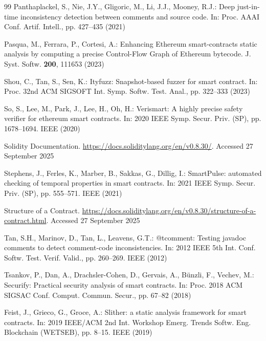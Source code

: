 \documentclass[pdflatex,sn-basic]{sn-jnl}%
\theoremstyle{thmstyleone}%
\theoremstyle{thmstyletwo}%
\theoremstyle{thmstylethree}%
\begin{document}
\begin{thebibliography}{99}
 Panthaplackel, S., Nie, J.Y., Gligoric, M., Li, J.J., Mooney, R.J.: Deep just-in-time inconsistency detection between comments and source code. In: Proc. AAAI Conf. Artif. Intell., pp. 427--435 (2021)

 Pasqua, M., Ferrara, P., Cortesi, A.: Enhancing Ethereum smart-contracts static analysis by computing a precise Control-Flow Graph of Ethereum bytecode. J. Syst. Softw. \textbf{200}, 111653 (2023)

 Shou, C., Tan, S., Sen, K.: Ityfuzz: Snapshot-based fuzzer for smart contract. In: Proc. 32nd ACM SIGSOFT Int. Symp. Softw. Test. Anal., pp. 322--333 (2023)

 So, S., Lee, M., Park, J., Lee, H., Oh, H.: Verismart: A highly precise safety verifier for ethereum smart contracts. In: 2020 IEEE Symp. Secur. Priv. (SP), pp. 1678--1694. IEEE (2020)

 Solidity Documentation. \url{https://docs.soliditylang.org/en/v0.8.30/}. Accessed 27 September 2025

 Stephens, J., Ferles, K., Marber, B., Sakkas, G., Dillig, I.: SmartPulse: automated checking of temporal properties in smart contracts. In: 2021 IEEE Symp. Secur. Priv. (SP), pp. 555--571. IEEE (2021)

 Structure of a Contract. \url{https://docs.soliditylang.org/en/v0.8.30/structure-of-a-contract.html}. Accessed 27 September 2025

 Tan, S.H., Marinov, D., Tan, L., Leavens, G.T.: @tcomment: Testing javadoc comments to detect comment-code inconsistencies. In: 2012 IEEE 5th Int. Conf. Softw. Test. Verif. Valid., pp. 260--269. IEEE (2012)

 Tsankov, P., Dan, A., Drachsler-Cohen, D., Gervais, A., B{\"u}nzli, F., Vechev, M.: Securify: Practical security analysis of smart contracts. In: Proc. 2018 ACM SIGSAC Conf. Comput. Commun. Secur., pp. 67--82 (2018)

 Feist, J., Grieco, G., Groce, A.: Slither: a static analysis framework for smart contracts. In: 2019 IEEE/ACM 2nd Int. Workshop Emerg. Trends Softw. Eng. Blockchain (WETSEB), pp. 8--15. IEEE (2019)


\end{thebibliography}
\end{document}
